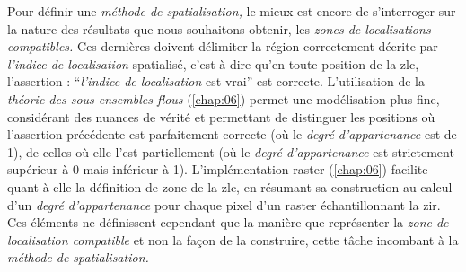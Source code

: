 Pour définir une \emph{méthode de spatialisation,} le mieux est encore
de s’interroger sur la nature des résultats que nous souhaitons
obtenir, les \emph{zones de localisations compatibles.} Ces dernières
doivent délimiter la région correctement décrite par \emph{l'indice de
  localisation} spatialisé, c'est-à-dire qu'en toute position de la
\ac{zlc}, l'assertion : \enquote{\emph{l'indice de localisation} est
  vrai} est correcte. L'utilisation de la \emph{théorie des
  sous-ensembles flous} (\autoref{chap:06}) permet une modélisation
plus fine, considérant des nuances de vérité et permettant de
distinguer les positions où l'assertion précédente est parfaitement
correcte (\ie où le \emph{degré d'appartenance} est de 1), de celles
où elle l'est partiellement (\ie où le \emph{degré d'appartenance} est
strictement supérieur à 0 mais inférieur à 1). L'implémentation raster
(\autoref{chap:06}) facilite quant à elle la définition de zone de la
\ac{zlc}, en résumant sa construction au calcul d'un \emph{degré
  d'appartenance} pour chaque pixel d'un raster échantillonnant la
\ac{zir}. Ces éléments ne définissent cependant que la manière que
représenter la \emph{zone de localisation compatible} et non la façon
de la construire, cette tâche incombant à la \emph{méthode de
  spatialisation.}


